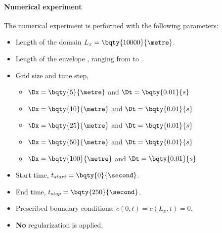 \paragraph*{Numerical experiment}
The numerical experiment is performed with the following parameters:
\begin{itemize}
    \item Length of the domain $L_x = \bqty{10000}{\metre}$.
    \item Length of the envelope , ranging from  to .
    \item Grid size and time step,
    \begin{itemize}
        \item $\Dx = \bqty{5}{\metre}$ and $\Dt = \bqty{0.01}{s}$
        \item $\Dx = \bqty{10}{\metre}$ and $\Dt = \bqty{0.01}{s}$
        \item $\Dx = \bqty{25}{\metre}$ and $\Dt = \bqty{0.01}{s}$
        \item $\Dx = \bqty{50}{\metre}$ and $\Dt = \bqty{0.01}{s}$
        \item $\Dx = \bqty{100}{\metre}$ and $\Dt = \bqty{0.01}{s}$
    \end{itemize}
    \item Start time, $t_{start} = \bqty{0}{\second}$.
    \item End time, $t_{stop} = \bqty{250}{\second}$.
    \item Prescribed boundary conditions: $c(0,t) = c(L_x,t) = 0$.
    \item \textbf{No} regularization is applied.
\end{itemize}
